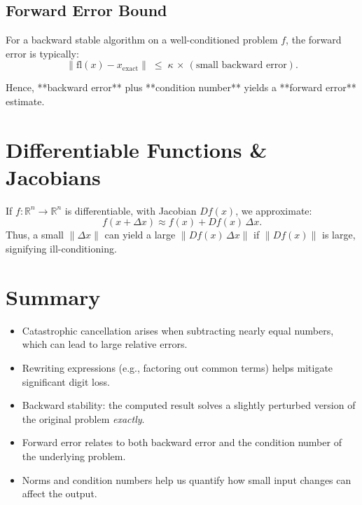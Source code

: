 \documentclass[12pt]{article}
\begin{document}
\subsection*{Forward Error Bound}
For a backward stable algorithm on a well-conditioned problem $f$, the forward error is typically:
\[
\|\mathrm{fl}(x) - x_{\mathrm{exact}}\| \;\le\; \kappa \,\times\, (\text{small backward error}).
\]

Hence, **backward error** plus **condition number** yields a **forward error** estimate.

\section*{Differentiable Functions \& Jacobians}

If $f:\mathbb{R}^n \to \mathbb{R}^n$ is differentiable, with Jacobian $Df(x)$, we approximate:
\[
f(x + \Delta x) \approx f(x) + Df(x)\,\Delta x.
\]
Thus, a small $\|\Delta x\|$ can yield a large $\|Df(x)\,\Delta x\|$ if $\|Df(x)\|$ is large, signifying ill-conditioning.

\section*{Summary}

\begin{itemize}
    \item Catastrophic cancellation arises when subtracting nearly equal numbers, which can lead to large relative errors.
    \item Rewriting expressions (e.g., factoring out common terms) helps mitigate significant digit loss.
    \item Backward stability: the computed result solves a slightly perturbed version of the original problem \emph{exactly}.
    \item Forward error relates to both backward error and the condition number of the underlying problem.
    \item Norms and condition numbers help us quantify how small input changes can affect the output.
\end{itemize}
\end{document}

